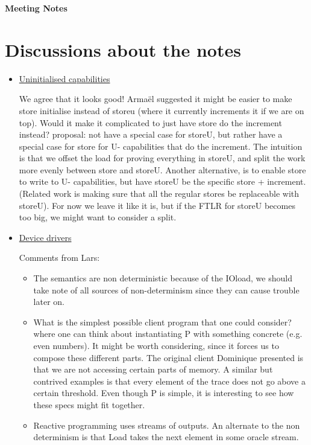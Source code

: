 \documentclass[a4paper, 10pt]{article}
\begin{document}
\lhead{}
\rhead{}
\renewcommand{\headrulewidth}{0pt}
\renewcommand{\footrulewidth}{0pt}


\begin{center}
{\LARGE \bf Meeting Notes}\\
\end{center}

\section{Discussions about the notes}
\begin{itemize}
\item \underline{Uninitialised capabilities}
	
We agree that it looks good! Arma\"{e}l suggested it might be easier to make store initialise instead of storeu (where it currently increments it if we are on top). Would it make it complicated to just have store do the increment instead? proposal: not have a special case for storeU, but rather have a special case for store for U- capabilities that do the increment. The intuition is that we offset the load for proving everything in storeU, and split the work more evenly between store and storeU. Another alternative, is to enable store to write to U- capabilities, but have storeU be the specific store + increment. 
(Related work is making sure that all the regular stores be replaceable with storeU). 
For now we leave it like it is, but if the FTLR for storeU becomes too big, we might want to consider a split.

\item \underline{Device drivers}

Comments from Lars: 
\begin{itemize}
	\item The semantics are non deterministic because of the IOload, we should take note of all sources of non-determinism since they can cause trouble later on. 
	\item What is the simplest possible client program that one could consider? where one can think about instantiating P with something concrete (e.g. even numbers). It might be worth considering, since it forces us to compose these different parts. The original client Dominique presented is that we are not accessing certain parts of memory. A similar but contrived examples is that every element of the trace does not go above a certain threshold. 
Even though P is simple, it is interesting to see how these specs might fit together. 
	\item Reactive programming uses streams of outputs. An alternate to the non determinism is that Load takes the next element in some oracle stream. 
	

\end{itemize}
\end{itemize}
\end{document}

